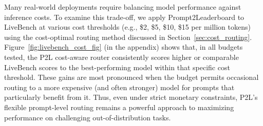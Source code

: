 Many real-world deployments require balancing model performance against inference costs. To examine this trade-off, we apply Prompt2Leaderboard to LiveBench at various cost thresholds (e.g., \$2, \$5, \$10, \$15 per million tokens) using the cost-optimal routing method discussed in Section~\ref{sec:cost_routing}.
Figure~\ref{fig:livebench_cost_fig} (in the appendix) shows that, in all budgets tested, the P2L cost-aware router consistently scores higher or comparable LiveBench scores to the best-performing model within that specific cost threshold. These gains are most pronounced when the budget permits occasional routing to a more expensive (and often stronger) model for prompts that particularly benefit from it. Thus, even under strict monetary constraints, P2L’s flexible prompt-level routing remains a powerful approach to maximizing performance on challenging out-of-distribution tasks.
